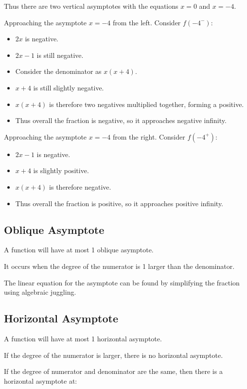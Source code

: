 \documentclass[a4paper,11pt]{article}
\begin{document}
Thus there are two vertical asymptotes with the equations $x = 0$ and $x = -4$.

Approaching the asymptote $x = -4$ from the left. Consider $f(-4^-)$:

\begin{itemize}
\item $2x$ is negative.
\item $2x - 1$ is still negative.
\item Consider the denominator as $x(x + 4)$.
\item $x + 4$ is still slightly negative.
\item $x(x + 4)$ is therefore two negatives multiplied together, forming a
	positive.
\item Thus overall the fraction is negative, so it approaches negative infinity.
\end{itemize}

Approaching the asymptote $x = -4$ from the right. Consider $f(-4^+)$:

\begin{itemize}
\item $2x - 1$ is negative.
\item $x + 4$ is slightly positive.
\item $x(x + 4)$ is therefore negative.
\item Thus overall the fraction is positive, so it approaches positive infinity.
\end{itemize}


\subsection{Oblique Asymptote}

A function will have at most 1 oblique asymptote.

It occurs when the degree of the numerator is 1 larger than the denominator.

The linear equation for the asymptote can be found by simplifying the fraction
using algebraic juggling.


\subsection{Horizontal Asymptote}

A function will have at most 1 horizontal asymptote.

If the degree of the numerator is larger, there is no horizontal asymptote.

If the degree of numerator and denominator are the same, then there is a
horizontal asymptote at:
\end{document}
